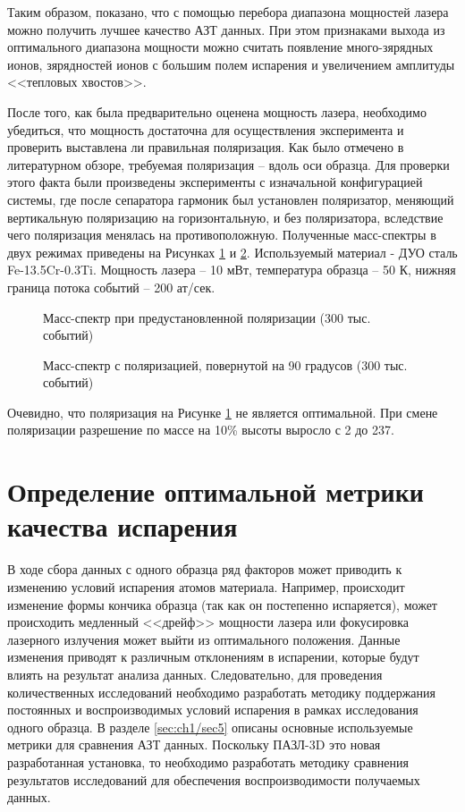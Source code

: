 Таким образом, показано, что с помощью перебора диапазона мощностей лазера можно получить лучшее качество АЗТ данных. При этом признаками выхода из оптимального диапазона мощности можно считать появление много-зярядных ионов, зярядностей ионов с большим полем испарения и увеличением амплитуды <<тепловых хвостов>>.

После того, как была предварительно оценена мощность лазера, необходимо убедиться, что мощность достаточна для осуществления эксперимента и проверить выставлена ли правильная поляризация. Как было отмечено в литературном обзоре, требуемая поляризация – вдоль оси образца. Для проверки этого факта были произведены эксперименты с изначальной конфигурацией системы, где после сепаратора гармоник был установлен поляризатор, меняющий вертикальную поляризацию на горизонтальную, и без поляризатора, вследствие чего поляризация менялась на противоположную. Полученные масс-спектры в двух режимах приведены на Рисунках \cref{fig:Oleg_polarize_ini} и \cref{fig:Oleg_polarize_final}. Используемый материал - ДУО сталь Fe-13.5Cr-0.3Ti. Мощность лазера – 10 мВт, температура образца – 50 К, нижняя граница потока событий – 200 ат/сек.

\begin{figure}[htb]
	\caption{Масс-спектр при предустановленной поляризации (300 тыс. событий)}
	\label{fig:Oleg_polarize_ini}
\end{figure}

\begin{figure}[htb]
	\caption{Масс-спектр с поляризацией, повернутой на 90 градусов (300 тыс. событий)}
	\label{fig:Oleg_polarize_final}
\end{figure}

Очевидно, что поляризация на Рисунке \cref{fig:Oleg_polarize_ini} не является оптимальной. При смене поляризации разрешение по массе на 10\% высоты выросло с 2 до 237.

\FloatBarrier

\section{Определение оптимальной метрики качества испарения}\label{sec:ch3/sect3}

В ходе сбора данных с одного образца ряд факторов может приводить к изменению условий испарения атомов материала. Например, происходит изменение формы кончика образца (так как он постепенно испаряется), может происходить медленный <<дрейф>>  мощности лазера или фокусировка лазерного излучения может выйти из оптимального положения. Данные изменения приводят к различным отклонениям в испарении, которые будут влиять на результат анализа данных. Следовательно, для проведения количественных исследований необходимо разработать методику поддержания постоянных и воспроизводимых условий испарения в рамках исследования одного образца. В разделе \cref{sec:ch1/sec5} описаны основные используемые метрики для сравнения АЗТ данных. Поскольку ПАЗЛ-3D это новая разработанная установка, то необходимо разработать методику сравнения результатов исследований для обеспечения воспроизводимости получаемых данных.

